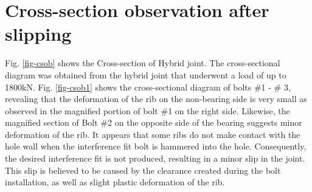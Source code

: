\section{Cross-section observation after slipping}

Fig. \ref{fig-csob} shows the Cross-section of Hybrid joint. The cross-sectional diagram was obtained from the hybrid joint that underwent a load of up to 1800kN. Fig. \ref{fig-csob1} shows the cross-sectional diagram of bolts \#1 - \# 3, revealing that the deformation of the rib on the non-bearing side is very small as observed in the magnified portion of bolt \#1 on the right side. Likewise, the magnified section of Bolt \#2 on the opposite side of the bearing suggests minor deformation of the rib. It appears that some ribs do not make contact with the hole wall when the interference fit bolt is hammered into the hole. Consequently, the desired interference fit is not produced, resulting in a minor slip in the joint. This slip is believed to be caused by the clearance created during the bolt installation, as well as slight plastic deformation of the rib.

